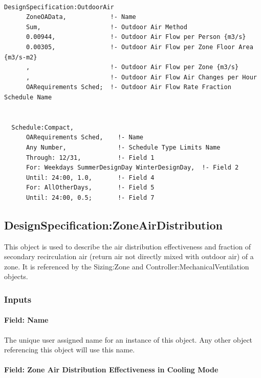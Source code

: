 \begin{lstlisting}

DesignSpecification:OutdoorAir
      ZoneOAData,            !- Name
      Sum,                   !- Outdoor Air Method
      0.00944,               !- Outdoor Air Flow per Person {m3/s}
      0.00305,               !- Outdoor Air Flow per Zone Floor Area {m3/s-m2}
      ,                      !- Outdoor Air Flow per Zone {m3/s}
      ,                      !- Outdoor Air Flow Air Changes per Hour
      OARequirements Sched;  !- Outdoor Air Flow Rate Fraction Schedule Name


  Schedule:Compact,
      OARequirements Sched,    !- Name
      Any Number,              !- Schedule Type Limits Name
      Through: 12/31,          !- Field 1
      For: Weekdays SummerDesignDay WinterDesignDay,  !- Field 2
      Until: 24:00, 1.0,       !- Field 4
      For: AllOtherDays,       !- Field 5
      Until: 24:00, 0.5;       !- Field 7
\end{lstlisting}

\subsection{DesignSpecification:ZoneAirDistribution}\label{designspecificationzoneairdistribution}

This object is used to describe the air distribution effectiveness and fraction of secondary recirculation air (return air not directly mixed with outdoor air) of a zone. It is referenced by the Sizing:Zone and Controller:MechanicalVentilation objects.

\subsubsection{Inputs}\label{inputs-1-011}

\paragraph{Field: Name}\label{field-name-1-010}

The unique user assigned name for an instance of this object. Any other object referencing this object will use this name.

\paragraph{Field: Zone Air Distribution Effectiveness in Cooling Mode}\label{field-zone-air-distribution-effectiveness-in-cooling-mode}

